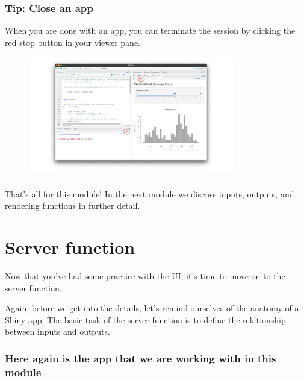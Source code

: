 \documentclass[
  letterpaper,
  DIV=11,
  numbers=noendperiod]{scrreprt}
\begin{document}
\hypertarget{tip-close-an-app-1}{%
\subsection{Tip: Close an app}\label{tip-close-an-app-1}}

When you are done with an app, you can terminate the session by clicking
the red stop button in your viewer pane.

\begin{figure}

{\centering \includegraphics[width=0.8\textwidth,height=\textheight]{./images/recap-6.png}

}

\end{figure}

\hypertarget{section-16}{%
\subsection{}\label{section-16}}

That's all for this module! In the next module we discuss inputs,
outputs, and rendering functions in further detail.

\hypertarget{server-function-2}{%
\chapter{Server function}\label{server-function-2}}

Now that you've had some practice with the UI, it's time to move on to
the server function.

Again, before we get into the details, let's remind ourselves of the
anatomy of a Shiny app. The basic task of the server function is to
define the relationship between inputs and outputs.

\hypertarget{here-again-is-the-app-that-we-are-working-with-in-this-module-2}{%
\subsection{Here again is the app that we are working with in this
module}\label{here-again-is-the-app-that-we-are-working-with-in-this-module-2}}
\end{document}
